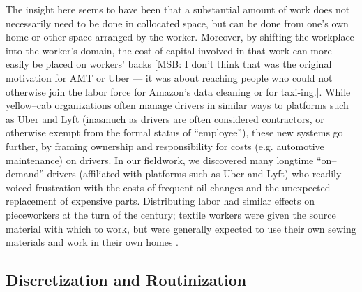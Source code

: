 \documentclass{sigchi}
\newcommand{\msb}[1]{{\color{PineGreen}[MSB: #1]}}
\begin{document}
The insight here seems to have been that
a substantial amount of work does not necessarily need to be done in collocated space,
but can be done from one's own home or other space arranged by the worker.
Moreover, by shifting the workplace into the worker's domain,
the cost of capital involved in that work can more easily be placed on workers' backs \msb{I don't think that was the original motivation for AMT or Uber --- it was about reaching people who could not otherwise join the labor force for Amazon's data cleaning or for taxi-ing.}.
While yellow--cab organizations often manage drivers in similar ways to platforms such as Uber and Lyft
(inasmuch as drivers are often considered contractors, or otherwise exempt from the formal status of ``employee''),
these new systems go further,
by framing ownership and responsibility for costs
(e.g. automotive maintenance)
on drivers.
In our fieldwork, we discovered many longtime ``on--demand'' drivers
(affiliated with platforms such as Uber and Lyft)
who readily voiced frustration with the costs of
frequent oil changes and the unexpected replacement of expensive parts.
Distributing labor had similar effects on pieceworkers at the turn of the  century;
textile workers were given the source material with which to work,
but were generally expected to use their own sewing materials and work in their own homes
\cite{hapke2004sweatshop}.








\subsection{Discretization and Routinization}
\end{document}
